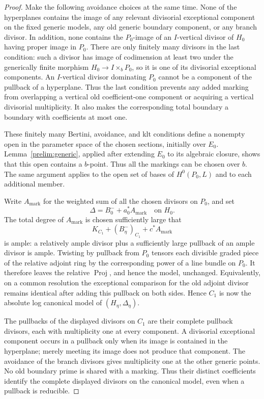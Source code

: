 \begin{proof}
Make the following avoidance choices at the same time.  None of the
hyperplanes contains the image of any relevant divisorial exceptional
component on the fixed generic models, any old generic boundary
component, or any branch divisor.  In addition, none contains the
$P_0$-image of an $I$-vertical divisor of $H_0$ having proper image in
$P_0$.  There are only finitely many divisors in the last condition:
such a divisor has image of codimension at least two under the
generically finite morphism $H_0\to I\times_bP_0$, so it is one of its
divisorial exceptional components.  An $I$-vertical divisor dominating
$P_0$ cannot be a component of the pullback of a hyperplane.  Thus the
last condition prevents any added marking from overlapping a vertical
old coefficient-one component or acquiring a vertical divisorial
multiplicity.  It also makes the corresponding total boundary a
boundary with coefficients at most one.

These finitely many Bertini, avoidance, and klt conditions define a
nonempty open in the parameter space of the chosen sections, initially
over $E_0$. Lemma~\ref{prelim:generic}, applied after extending $E_0$
to its algebraic closure, shows that this open contains a $b$-point.
Thus all the markings can be chosen over $b$. The same argument applies
to the open set of bases of $H^0(P_0,L)$ and to each additional member.

Write $A_{\mathrm{mark}}$ for the weighted sum of all the chosen
divisors on $P_0$, and set
\[
 \Delta=B_0^-+a_0^*A_{\mathrm{mark}}
 \quad\text{on }H_0.
\]
The total degree of $A_{\mathrm{mark}}$ is chosen sufficiently large
that
\[
 K_{C_1}+(B_\eta^-)_{{C_1}}+c^*A_{\mathrm{mark}}
\]
is ample: a relatively ample divisor plus a sufficiently large
pullback of an ample divisor is ample.  Twisting by pullback from
$P_0$ tensors each divisible graded piece of the relative adjoint ring
by the corresponding power of a line bundle on $P_0$.  It therefore
leaves the relative $\operatorname{Proj}$, and hence the model, unchanged.
Equivalently, on a common resolution the exceptional comparison for
the old adjoint divisor remains identical after adding this pullback
on both sides.  Hence $C_1$ is now the absolute log canonical model of
$(H_\eta,\Delta_\eta)$.

The pullbacks of the displayed divisors on $C_1$ are their complete
pullback divisors, each with multiplicity one at every component.  A
divisorial exceptional component occurs in a pullback only when its
image is contained in the hyperplane; merely meeting its image does not
produce that component.  The avoidance of the branch divisors gives
multiplicity one at the other generic points.  No old boundary prime
is shared with a marking.  Thus their distinct coefficients identify
the complete displayed divisors on the canonical model, even when a
pullback is reducible.


\end{proof}
